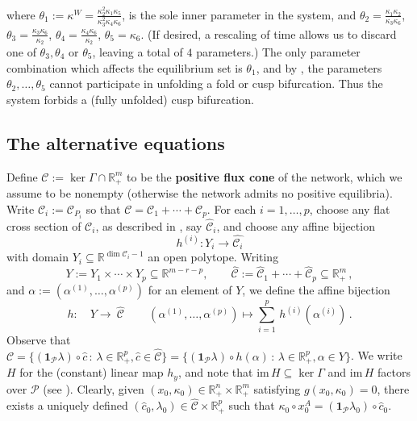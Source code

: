 \documentclass[11pt]{amsart}
\renewcommand{\k}{\kappa}
\renewcommand{\t}{\theta}
\newcommand{\R}{\mathbb{R}}
\newcommand{\mP}{\mathcal{P}}
\newcommand{\mC}{\mathcal{C}}
\theoremstyle{definition}
\newenvironment{ex}
  {\pushQED{\qed}\renewcommand{\qedsymbol}{$\Diamond$}\example}
  {\popQED\endexample}
\begin{document}
\begin{ex}[Revisiting \Cref{Ex363a}]
\[\]
where $\t_1 := \k^{W} = \frac{\k_2^2\k_1\k_5}{\k_3^2\k_4\k_6}$, is the sole inner parameter in the system, and $\t_2 = \frac{\k_1\k_2}{\k_3\k_6}$, $\t_3 = \frac{\k_3\k_6}{\k_2}$, $\t_4 = \frac{\k_4\k_6}{\k_2}$, $\t_5 = \k_6$. (If desired, a rescaling of time allows us to discard one of $\t_3, \t_4$ or $\t_5$, leaving a total of $4$ parameters.) The only parameter combination which affects the equilibrium set is $\t_1$, and by , the parameters $\t_2, \ldots, \t_5$ cannot participate in unfolding a fold or cusp bifurcation. Thus the system forbids a (fully unfolded) cusp bifurcation. 
\end{ex}

\subsection{The alternative equations}

Define $\mC:= \ker \Gamma \cap \R^m_+$ to be the {\bf positive flux cone} of the network, which we assume to be nonempty (otherwise the network admits no positive equilibria). Write $\mC_i:=\mC_{P_i}$ so that $\mC = \mC_1 + \cdots + \mC_{p}$. For each $i = 1, \ldots, p$, choose any flat cross section of $\mC_i$, as described in \cite{banajifeliu26}, say $\widehat{\mC}_i$, and choose any affine bijection 
\[h^{(i)} \colon Y_i \longrightarrow \widehat{\mC_i}\]
with domain $Y_i \subseteq \mathbb{R}^{\dim \mC_i-1}$ an open polytope. Writing 
\[ Y := Y_1 \times \cdots \times Y_p \subseteq \mathbb{R}^{m-r-p},\quad  \quad \widehat{\mC}:= \widehat{\mC}_1 + \cdots + \widehat{\mC}_p \subseteq \R^m_+\, , \]
and 
$\alpha := (\alpha^{(1)}, \ldots, \alpha^{(p)})$ for an element of $Y$,
we define the affine bijection
\begin{equation}\label{eq:h}
h \colon \quad Y \longrightarrow  \  \widehat{\mC}  \, \qquad 
(\alpha^{(1)}, \ldots, \alpha^{(p)}) \mapsto  \sum_{i=1}^p\,h^{(i)}(\alpha^{(i)}) \,. 
\end{equation}
Observe that $\mC = \{(\bm{1}_{\mP}\lambda) \circ \hat{c}\,:\, \lambda \in \R^p_+, \hat{c} \in \widehat{\mC}\} = \{(\bm{1}_{\mP}\lambda) \circ h(\alpha)\,:\, \lambda \in \R^p_+, \alpha \in Y\}$. We write $H$ for the (constant) linear map $h_y$, and note that $\mathrm{im}\,H \subseteq \ker \Gamma$ and $\mathrm{im}\,H$ factors over $\mP$ (see \cite[Lemma 3.5]{banajifeliu26}). Clearly, given $(x_0, \k_0) \in \R^n_+ \times \R^m_+$ satisfying $g(x_0, \k_0)=0$, there exists a uniquely defined $(\hat{c}_0, \lambda_0) \in \widehat{\mC} \times \R^p_+$ such that $\k_0 \circ x_0^A = (\bm{1}_{\mP}\lambda_0) \circ \hat{c}_0$. 
\end{document}
